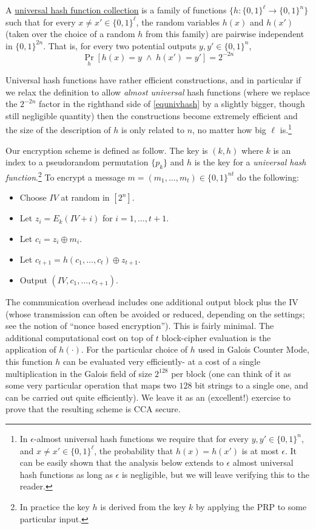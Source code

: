 A \href{https://goo.gl/jLpNtU}{universal hash function collection} is a
family of functions \(\{ h:\{0,1\}^\ell\rightarrow\{0,1\}^n \}\) such
that for every \(x \neq x' \in \{0,1\}^\ell\), the random variables
\(h(x)\) and \(h(x')\) (taken over the choice of a random \(h\) from
this family) are pairwise independent in \(\{0,1\}^{2n}\). That is, for
every two potential outputs \(y,y'\in \{0,1\}^n\), \[
\Pr_h[ h(x)=y \;\wedge\; h(x')=y']=2^{-2n} \label{equnivhash}
\]

Universal hash functions have rather efficient constructions, and in
particular if we relax the definition to allow \emph{almost universal}
hash functions (where we replace the \(2^{-2n}\) factor in the righthand
side of \eqref{equnivhash} by a slightly bigger, though still negligible
quantity) then the constructions become extremely efficient and the size
of the description of \(h\) is only related to \(n\), no matter how big
\(\ell\) is.\footnote{In \(\epsilon\)-almost universal hash functions we
  require that for every \(y,y'\in \{0,1\}^{n}\), and
  \(x\neq x' \in \{0,1\}^\ell\), the probability that \(h(x)= h(x')\) is
  at most \(\epsilon\). It can be easily shown that the analysis below
  extends to \(\epsilon\) almost universal hash functions as long as
  \(\epsilon\) is negligible, but we will leave verifying this to the
  reader.}

Our encryption scheme is defined as follow. The key is \((k,h)\) where
\(k\) is an index to a pseudorandom permutation \(\{ p_k \}\) and \(h\)
is the key for a \emph{universal hash function}.\footnote{In practice
  the key \(h\) is derived from the key \(k\) by applying the PRP to
  some particular input.} To encrypt a message
\(m = (m_1,\ldots,m_t) \in \{0,1\}^{nt}\) do the following:

\begin{itemize}
\item
  Choose \(\ensuremath{\mathit{IV}}\) at random in \([2^n]\).
\item
  Let \(z_i = E_k(\ensuremath{\mathit{IV}}+i)\) for \(i=1,\ldots,t+1\).
\item
  Let \(c_i = z_i \oplus m_i\).
\item
  Let \(c_{t+1} = h(c_1,\ldots,c_t) \oplus z_{t+1}\).
\item
  Output \((\ensuremath{\mathit{IV}},c_1,\ldots,c_{t+1})\).
\end{itemize}

The communication overhead includes one additional output block plus the
IV (whose transmission can often be avoided or reduced, depending on the
settings; see the notion of ``nonce based encryption''). This is fairly
minimal. The additional computational cost on top of \(t\) block-cipher
evaluation is the application of \(h(\cdot)\). For the particular choice
of \(h\) used in Galois Counter Mode, this function \(h\) can be
evaluated very efficiently- at a cost of a single multiplication in the
Galois field of size \(2^{128}\) per block (one can think of it as some
very particular operation that maps two \(128\) bit strings to a single
one, and can be carried out quite efficiently). We leave it as an
(excellent!) exercise to prove that the resulting scheme is CCA secure.

